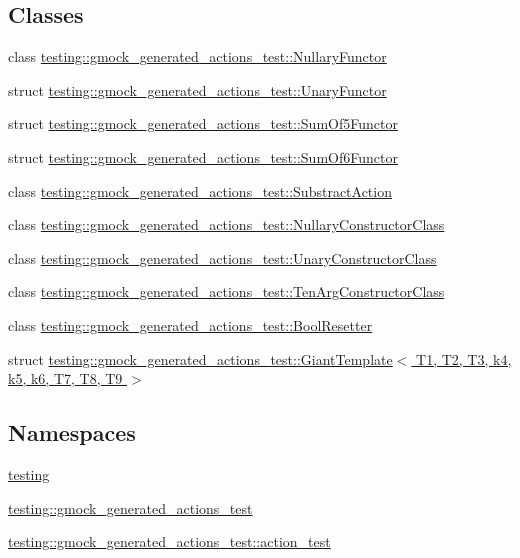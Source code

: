 \subsection*{Classes}
\begin{DoxyCompactItemize}
\item 
class \hyperlink{classtesting_1_1gmock__generated__actions__test_1_1NullaryFunctor}{testing\+::gmock\+\_\+generated\+\_\+actions\+\_\+test\+::\+Nullary\+Functor}
\item 
struct \hyperlink{structtesting_1_1gmock__generated__actions__test_1_1UnaryFunctor}{testing\+::gmock\+\_\+generated\+\_\+actions\+\_\+test\+::\+Unary\+Functor}
\item 
struct \hyperlink{structtesting_1_1gmock__generated__actions__test_1_1SumOf5Functor}{testing\+::gmock\+\_\+generated\+\_\+actions\+\_\+test\+::\+Sum\+Of5\+Functor}
\item 
struct \hyperlink{structtesting_1_1gmock__generated__actions__test_1_1SumOf6Functor}{testing\+::gmock\+\_\+generated\+\_\+actions\+\_\+test\+::\+Sum\+Of6\+Functor}
\item 
class \hyperlink{classtesting_1_1gmock__generated__actions__test_1_1SubstractAction}{testing\+::gmock\+\_\+generated\+\_\+actions\+\_\+test\+::\+Substract\+Action}
\item 
class \hyperlink{classtesting_1_1gmock__generated__actions__test_1_1NullaryConstructorClass}{testing\+::gmock\+\_\+generated\+\_\+actions\+\_\+test\+::\+Nullary\+Constructor\+Class}
\item 
class \hyperlink{classtesting_1_1gmock__generated__actions__test_1_1UnaryConstructorClass}{testing\+::gmock\+\_\+generated\+\_\+actions\+\_\+test\+::\+Unary\+Constructor\+Class}
\item 
class \hyperlink{classtesting_1_1gmock__generated__actions__test_1_1TenArgConstructorClass}{testing\+::gmock\+\_\+generated\+\_\+actions\+\_\+test\+::\+Ten\+Arg\+Constructor\+Class}
\item 
class \hyperlink{classtesting_1_1gmock__generated__actions__test_1_1BoolResetter}{testing\+::gmock\+\_\+generated\+\_\+actions\+\_\+test\+::\+Bool\+Resetter}
\item 
struct \hyperlink{structtesting_1_1gmock__generated__actions__test_1_1GiantTemplate}{testing\+::gmock\+\_\+generated\+\_\+actions\+\_\+test\+::\+Giant\+Template$<$ T1, T2, T3, k4, k5, k6, T7, T8, T9 $>$}
\end{DoxyCompactItemize}
\subsection*{Namespaces}
\begin{DoxyCompactItemize}
\item 
 \hyperlink{namespacetesting}{testing}
\item 
 \hyperlink{namespacetesting_1_1gmock__generated__actions__test}{testing\+::gmock\+\_\+generated\+\_\+actions\+\_\+test}
\item 
 \hyperlink{namespacetesting_1_1gmock__generated__actions__test_1_1action__test}{testing\+::gmock\+\_\+generated\+\_\+actions\+\_\+test\+::action\+\_\+test}
\end{DoxyCompactItemize}
